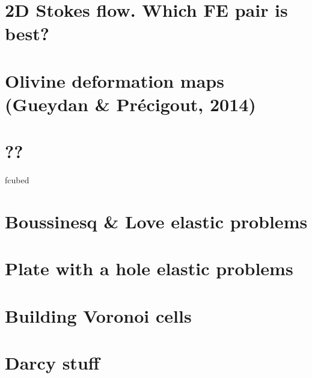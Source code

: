 \documentclass[a4paper,11pt]{report}
\begin{document}
\chapter{2D Stokes flow. Which FE pair is best? \label{f120}} %

\chapter{Olivine deformation maps (Gueydan \& Pr{\'e}cigout, 2014)  \label{f121}} %

\chapter{??\label{f122}} fcubed %

\chapter{Boussinesq \& Love elastic problems\label{f123}} %

\chapter{Plate with a hole elastic problems \label{f124}} %

\chapter{Building Voronoi cells \label{f125}} %

\chapter{Darcy stuff\label{f126}} %
\end{document}
